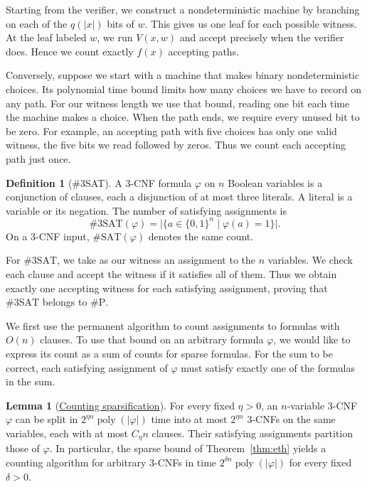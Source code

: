 \documentclass{article}
\theoremstyle{definition}
\newtheorem{lemma}[theorem]{Lemma}
\newtheorem{definition}[theorem]{Definition}
\begin{document}
Starting from the verifier, we construct a nondeterministic machine by
branching on each of the \(q(|x|)\) bits of \(w\). This gives us one
leaf for each possible witness. At the leaf labeled \(w\), we run
\(V(x,w)\) and accept precisely when the verifier does. Hence we count
exactly \(f(x)\) accepting paths.

Conversely, suppose we start with a machine that makes binary
nondeterministic choices. Its polynomial time bound limits how many
choices we have to record on any path. For our witness length we use
that bound, reading one bit each time the machine makes a choice.
When the path ends, we require every unused bit to be zero. For example,
an accepting path with five choices has only one valid witness, the five
bits we read followed by zeros. Thus we count each accepting path just once.

\begin{definition}[\#3SAT]
A 3-CNF formula \(\varphi\) on \(n\) Boolean variables is a conjunction of
clauses, each a disjunction of at most three literals. A literal is a variable
or its negation. The number of satisfying assignments is
\[
    \#\mathrm{3SAT}(\varphi)
    =\bigl|\{a\in\{0,1\}^n\mid\varphi(a)=1\}\bigr|.
\]
On a 3-CNF input, \(\#\mathrm{SAT}(\varphi)\) denotes the same count.
\end{definition}

For \(\#\mathrm{3SAT}\), we take as our witness an assignment to the
\(n\) variables. We check each clause and accept the witness if it
satisfies all of them. Thus we obtain exactly one accepting witness for
each satisfying assignment, proving that \(\#\mathrm{3SAT}\) belongs
to \(\#\mathrm P\).

We first use the permanent algorithm to count assignments to formulas with
\(O(n)\) clauses. To use that bound on an arbitrary formula \(\varphi\),
we would like to express its count as a sum of counts for sparse
formulas. For the sum to be correct, each satisfying assignment of
\(\varphi\) must satisfy exactly one of the formulas in the sum.

\begin{lemma}[\href{https://arxiv.org/abs/1206.1775}{Counting sparsification}]\label{lem:sparsify}
For every fixed \(\eta>0\), an \(n\)-variable 3-CNF \(\varphi\) can be split in
\(2^{\eta n}\operatorname{poly}(|\varphi|)\) time into at most \(2^{\eta n}\)
3-CNFs on the same variables, each with at most \(C_\eta n\) clauses. Their
satisfying assignments partition those of \(\varphi\). In particular, the
sparse bound of Theorem~\ref{thm:eth} yields a counting algorithm for arbitrary
3-CNFs in time \(2^{\delta n}\operatorname{poly}(|\varphi|)\) for every fixed
\(\delta>0\).
\end{lemma}
\end{document}
